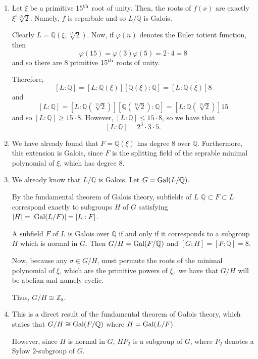 \documentclass[12pt]{Qual}
\begin{document}
\begin{solution}$\,$
\begin{enumerate}[label=(\alph*)]
    \item Let $\xi$ be a primitive $15^\text{th}$ root of unity. Then, the roots of $f(x)$ are exactly $\xi^i\sqrt[15]{2}$. Namely, $f$ is separbale and so $L/\mathbb{Q}$ is Galois.

    Clearly $L=\mathbb{Q}(\xi,\sqrt[15]{2})$. Now, if $\varphi(n)$ denotes the Euler totient function, then $$\varphi(15)=\varphi(3)\varphi(5)=2\cdot 4=8$$ and so there are $8$ primitive $15^\text{th}$ roots of unity.

    Therefore, $$[L:\mathbb{Q}]=[L:\mathbb{Q}(\xi)][\mathbb{Q}(\xi):\mathbb{Q}]=[L:\mathbb{Q}(\xi)]8$$ and $$[L:\mathbb{Q}]=[L:\mathbb{Q}(\sqrt[15]{2})][\mathbb{Q}(\sqrt[15]{2}):\mathbb{Q}]=[L:\mathbb{Q}(\sqrt[15]{2})]15$$ and so $[L:\mathbb{Q}]\ge 15\cdot 8$. However, $[L:\mathbb{Q}]\le 15\cdot 8$, so we have that $$[L:\mathbb{Q}]=2^3\cdot 3\cdot 5.$$
    \item We have already found that $F=\mathbb{Q}(\xi)$ has degree $8$ over $\mathbb{Q}$. Furthermore, this extension is Galois, since $F$ is the splitting field of the seprable minimal polynomial of $\xi$, which has degree $8.$

    \item We already know that $L/\mathbb{Q}$ is Galois. Let $G=\text{Gal}(L/\mathbb{Q}).$

    By the fundamental theorem of Galois theory, subfields of $L$ $\mathbb{Q}\subset F\subset L$ correspond exactly to subgroups $H$ of $G$ satisfying $|H|=|\text{Gal}(L/F)|=[L:F]$.

    A subfield $F$ of $L$ is Galois over $\mathbb{Q}$ if and only if it corresponds to a subgroup $H$ which is normal in $G$. Then $G/H=\text{Gal}(F/\mathbb{Q})$ and $[G:H]=[F:\mathbb{Q}]=8$.

    Now, because any $\sigma\in G/H$, must permute the roots of the minimal polynomial of $\xi$, which are the primitive powers of $\xi,$ we have that $G/H$ will be abelian and namely cyclic.

    Thus, $G/H\cong\mathbb{Z}_8$.

    \item This is a direct result of the fundamental theorem of Galois theory, which states that $G/H\cong \text{Gal}(F/\mathbb{Q})$ where $H=\text{Gal}(L/F).$

    However, since $H$ is normal in $G$, $HP_2$ is a subgroup of $G$, where $P_2$ denotes a Sylow $2$-subgroup of $G.$


\end{enumerate}
\end{solution}
\end{document}
